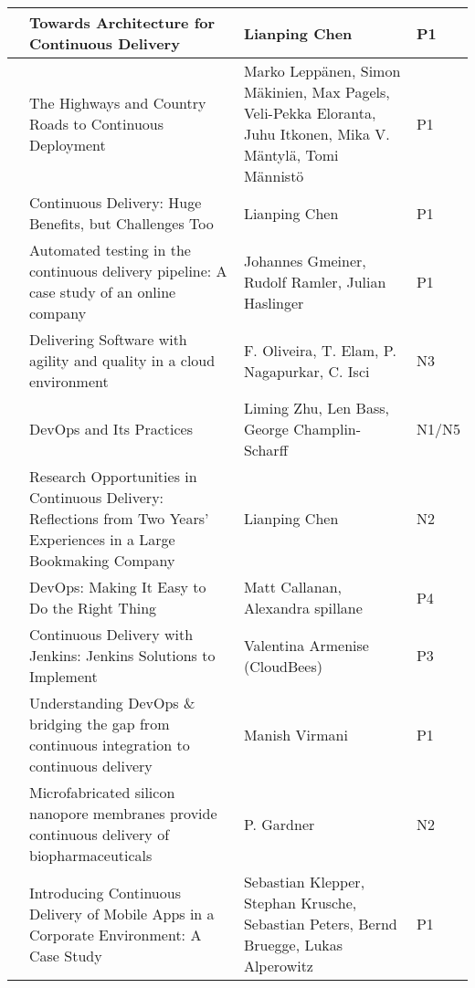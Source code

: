 \begin{landscape}
\begin{longtable}{|l|L{10cm}|L{10cm}|l|}
    & Towards Architecture for Continuous Delivery & Lianping Chen & P1 \\ \hline
   
    & The Highways and Country Roads to Continuous Deployment & Marko Leppänen, Simon Mäkinien, Max Pagels, Veli-Pekka Eloranta, Juhu Itkonen, Mika V. Mäntylä, Tomi Männistö & P1 \\ \hline
   
    & Continuous Delivery: Huge Benefits, but Challenges Too & Lianping Chen & P1 \\ \hline
    
    & Automated testing in the continuous delivery pipeline: A case study of an online company & Johannes Gmeiner, Rudolf Ramler, Julian Haslinger & P1 \\ \hline
   
    & Delivering Software with agility and quality in a cloud environment & F. Oliveira, T. Elam, P. Nagapurkar, C. Isci & N3 \\ \hline
   
    & DevOps and Its Practices & Liming Zhu, Len Bass, George Champlin-Scharff & N1/N5 \\ \hline
   
    & Research Opportunities in Continuous Delivery: Reflections from Two Years' Experiences in a Large Bookmaking Company & Lianping Chen & N2 \\ \hline
   
    & DevOps: Making It Easy to Do the Right Thing & Matt Callanan, Alexandra spillane & P4 \\ \hline
   
    & Continuous Delivery with Jenkins: Jenkins Solutions to Implement & Valentina Armenise (CloudBees) & P3 \\ \hline
   
    & Understanding DevOps \& bridging the gap from continuous integration to continuous delivery & Manish Virmani & P1 \\ \hline
   
    & Microfabricated silicon nanopore membranes provide continuous delivery of biopharmaceuticals & P. Gardner & N2 \\ \hline
   
    & Introducing Continuous Delivery of Mobile Apps in a Corporate Environment: A Case Study & Sebastian Klepper, Stephan Krusche, Sebastian Peters, Bernd Bruegge, Lukas Alperowitz & P1 \\ \hline
   

\end{longtable}
\end{landscape}
